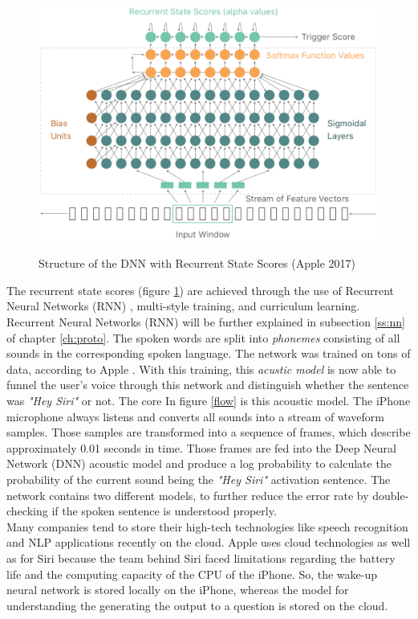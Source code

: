 \begin{figure}
  \begin{center}
  \includegraphics[width=4.5in]{photos/TrainingDNN-1}\\
  \caption{Structure of the DNN with Recurrent State Scores (Apple 2017) \cite{siri1}}\label{dnn}
  \end{center}
\end{figure}

The recurrent state scores (figure \ref{dnn}) are achieved through the use of Recurrent Neural Networks (RNN) \cite{siri2}, multi-style training, and curriculum learning. 
Recurrent Neural Networks (RNN) will be further explained in subsection \ref{ss:nn} of chapter \ref{ch:proto}. The spoken words are split into \textit{phonemes} consisting of all sounds in the corresponding spoken language. The network was trained on tons of data, according to Apple \cite{siri1}. With this training, this \textit{acustic model} is now able to funnel the user's voice through this network and distinguish whether the sentence was \textit{"Hey Siri"} or not. The core In figure \ref{flow} is this acoustic model. The iPhone microphone always listens and converts all sounds into a stream of waveform samples. Those samples are transformed into a sequence of frames, which describe approximately 0.01 seconds in time. Those frames are fed into the Deep Neural Network (DNN) acoustic model and produce a log probability to calculate the probability of the current sound being the \textit{"Hey Siri"} activation sentence. The network contains two different models, to further reduce the error rate by double-checking if the spoken sentence is understood properly. 
\\
Many companies tend to store their high-tech technologies like speech recognition and NLP applications recently on the cloud. Apple uses cloud technologies as well as \cite{siri1} for Siri because the team behind Siri faced limitations regarding the battery life and the computing capacity of the CPU of the iPhone. So, the wake-up neural network is stored locally on the iPhone, whereas the model for understanding the generating the output to a question is stored on the cloud.

